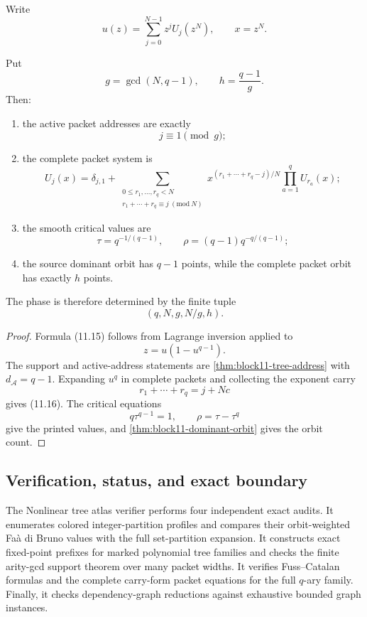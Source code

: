 Write
\[
 u(z)=\sum_{j=0}^{N-1}z^jU_j(z^N),
 \qquad x=z^N.
\]

\begin{theorem}
\label{thm:block11-qary-phase}
Put
\[
 g=\gcd(N,q-1),
 \qquad
 h=\frac{q-1}{g}.
\]
Then:
\begin{enumerate}
\item the active packet addresses are exactly
\[
 \boxed{j\equiv1\pmod g;}
\]
\item the complete packet system is
\[
\boxed{
 U_j(x)
 =
 \delta_{j,1}
 +
 \sum_{\substack{0\le r_1,\ldots,r_q<N\\
 r_1+\cdots+r_q\equiv j\ (\mathrm{mod}\ N)}}
 x^{(r_1+\cdots+r_q-j)/N}
 \prod_{a=1}^{q}U_{r_a}(x);}
 \tag{11.16}
\]
\item the smooth critical values are
\[
 \tau=q^{-1/(q-1)},
 \qquad
 \rho=(q-1)q^{-q/(q-1)};
\]
\item the source dominant orbit has $q-1$ points, while the complete packet orbit has exactly $h$ points.
\end{enumerate}
The phase is therefore determined by the finite tuple
\[
 \boxed{(q,N,g,N/g,h).}
 \tag{11.17}
\]
\end{theorem}

\begin{proof}
Formula \textup{(11.15)} follows from Lagrange inversion applied to
\[
 z=u(1-u^{q-1}).
\]
The support and active-address statements are \cref{thm:block11-tree-address} with $d_{\mathcal A}=q-1$.  Expanding $u^q$ in complete packets and collecting the exponent carry
\[
 r_1+\cdots+r_q=j+Nc
\]
gives \textup{(11.16)}.  The critical equations
\[
 q\tau^{q-1}=1,
 \qquad
 \rho=\tau-\tau^q
\]
give the printed values, and \cref{thm:block11-dominant-orbit} gives the orbit count.
\end{proof}



\subsection{Verification, status, and exact boundary}
\label{subsec:block11-validation}

The Nonlinear tree atlas verifier performs four independent exact audits.  It enumerates colored integer-partition profiles and compares their orbit-weighted Fa\`a di Bruno values with the full set-partition expansion.  It constructs exact fixed-point prefixes for marked polynomial tree families and checks the finite arity-gcd support theorem over many packet widths.  It verifies Fuss--Catalan formulas and the complete carry-form packet equations for the full $q$-ary family.  Finally, it checks dependency-graph reductions against exhaustive bounded graph instances.

